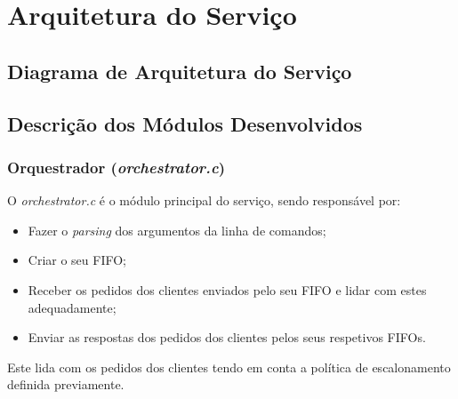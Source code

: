 \documentclass[a4paper,11pt]{scrreprt}
\begin{document}
\renewcommand{\contentsname}{Índice}
\renewcommand{\listfigurename}{Índice de Figuras}

\begin{minipage}{\textwidth}
\tableofcontents
\listoffigures
\end{minipage}





\chapter{Arquitetura do Serviço}
    \section{Diagrama de Arquitetura do Serviço}
    \section{Descrição dos Módulos Desenvolvidos}
        \subsection{Orquestrador (\textit{orchestrator.c})}
        O \textit{orchestrator.c} é o módulo principal do serviço, sendo responsável por:
        \begin{itemize}
            \item Fazer o \textit{parsing} dos argumentos da linha de comandos;
            \item Criar o seu FIFO;
            \item Receber os pedidos dos clientes enviados pelo seu FIFO e lidar com estes adequadamente;
            \item Enviar as respostas dos pedidos dos clientes pelos seus respetivos FIFOs.
        \end{itemize}
        Este lida com os pedidos dos clientes tendo em conta a política de escalonamento definida previamente.
\end{document}
